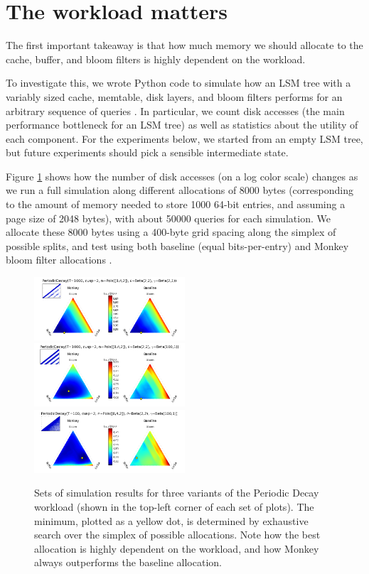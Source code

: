 \documentclass{sig-alternate-05-2015}
\begin{document}
\pagebreak

\section{The workload matters}

The first important takeaway is that how much memory we should allocate to the cache,
buffer, and bloom filters is highly dependent on the workload.

To investigate this, we wrote Python code to simulate how an LSM tree with a
variably sized cache, memtable, disk layers, and bloom filters performs for an
arbitrary sequence of queries \cite{lsmulator}. In particular, we count disk
accesses (the main performance bottleneck for an LSM tree) as well as
statistics about the utility of each component. For the experiments below, we
started from an empty LSM tree, but future experiments should pick a sensible
intermediate state.

Figure \ref{fig:period-lsmulations} shows how the number of disk accesses (on a log
color scale) changes as we run a full simulation along different allocations of
8000 bytes (corresponding to the amount of memory needed to store 1000 64-bit
entries, and assuming a page size of 2048 bytes), with about 50000 queries
for each simulation. We allocate these 8000 bytes using a 400-byte grid spacing
along the simplex of possible splits, and test using both baseline (equal bits-per-entry) and Monkey
bloom filter allocations \cite{monkey}.

\begin{figure}[!htb]
\begin{center}
\includegraphics[width=0.5\textwidth]{period2.png}
\includegraphics[width=0.5\textwidth]{period1.png}
\includegraphics[width=0.5\textwidth]{period3.png}
\end{center}
\caption{Sets of simulation results for three variants of the Periodic Decay
workload (shown in the top-left corner of each set of plots). The minimum,
plotted as a yellow dot, is determined by exhaustive search over the simplex
of possible allocations. Note how the best allocation is highly dependent
on the workload, and how Monkey always outperforms the baseline allocation.}
\label{fig:period-lsmulations}
\end{figure}
\end{document}
